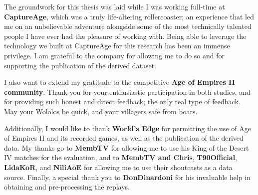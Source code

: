The groundwork for this thesis was laid while I was working full-time at \textbf{CaptureAge}, which was a truly life-altering rollercoaster; an experience that led me on an unbelievable adventure alongside some of the most technically talented people I have ever had the pleasure of working with. Being able to leverage the technology we built at CaptureAge for this research has been an immense privilege. I am grateful to the company for allowing me to do so and for supporting the publication of the derived dataset. 

I also want to extend my gratitude to the competitive \textbf{Age of Empires II community}. Thank you for your enthusiastic participation in both studies, and for providing such honest and direct feedback; the only real type of feedback. May your Wololos be quick, and your villagers safe from boars.

Additionally, I would like to thank \textbf{World's Edge} for permitting the use of Age of Empires II and its recorded games, as well as the publication of the derived data. My thanks go to \textbf{MembTV} for allowing me to use his King of the Desert IV matches for the evaluation, and to \textbf{MembTV and Chris}, \textbf{T90Official}, \textbf{LidaKoR}, and \textbf{NiliAoE} for allowing me to use their shoutcasts as a data source. Finally, a special thank you to \textbf{DonDinardoni} for his invaluable help in obtaining and pre-processing the replays.